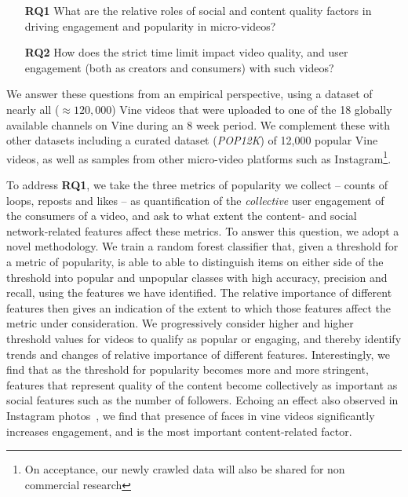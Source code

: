 \begin{itemize}
    \item[\textbf{RQ1}] What are the relative roles of  social and content quality factors in driving engagement and popularity in micro-videos?
    \item[\textbf{RQ2}] How does the strict time limit impact video quality, and user engagement (both as creators and consumers) with such videos? %
\end{itemize}

We answer these questions from an empirical perspective, using a dataset of nearly all ($\approx 120,000$) Vine videos that were uploaded to one of the 18 globally available channels on Vine during an 8 week period. We complement these with other datasets including a curated dataset (\emph{POP12K}) of 12,000 popular Vine videos, as well as samples from other micro-video platforms such as Instagram\footnote{On acceptance, our newly crawled data will also be shared  for non commercial research}. 

To address \textbf{RQ1}, we take the three metrics of popularity we collect -- counts of loops, reposts and likes -- as quantification of the \emph{collective} user engagement of the consumers of a video, and ask to what extent the content- and social network-related features affect these metrics. To answer this question, we adopt a novel methodology.
We train a random forest classifier that, given a threshold for a metric of popularity, is able to able to distinguish items on either side of the threshold into popular and unpopular classes  with high accuracy, precision and recall, using the features we have identified. The relative importance of different features then gives an indication of the extent to which those features affect the metric under consideration. We progressively consider higher and higher threshold values for videos to qualify as popular or engaging, and thereby identify trends and changes of relative importance of different features. Interestingly, we find that as the threshold for popularity becomes more and more stringent, features that represent quality of the content become collectively as important as social features such as the number of followers. Echoing an effect also observed in Instagram photos~\cite{bakhshi2014faces}, we find that presence of faces in vine videos significantly increases engagement, and is the most important content-related factor.

